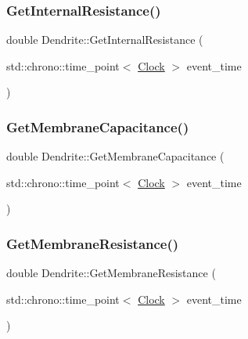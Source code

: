 \mbox{\label{classDendrite_a7dd00ac5440edf9943389951a275b9bc}} 
\subsubsection{\texorpdfstring{Get\+Internal\+Resistance()}{GetInternalResistance()}}
{\footnotesize\ttfamily double Dendrite\+::\+Get\+Internal\+Resistance (\begin{DoxyParamCaption}\item[{std\+::chrono\+::time\+\_\+point$<$ \mbox{\hyperlink{universe_8h_a0ef8d951d1ca5ab3cfaf7ab4c7a6fd80}{Clock}} $>$}]{event\+\_\+time }\end{DoxyParamCaption})\hspace{0.3cm}{\ttfamily [inline]}}

\mbox{\label{classDendrite_a3551fe5fcf9c7ec767a6171f61a5ba51}} 
\subsubsection{\texorpdfstring{Get\+Membrane\+Capacitance()}{GetMembraneCapacitance()}}
{\footnotesize\ttfamily double Dendrite\+::\+Get\+Membrane\+Capacitance (\begin{DoxyParamCaption}\item[{std\+::chrono\+::time\+\_\+point$<$ \mbox{\hyperlink{universe_8h_a0ef8d951d1ca5ab3cfaf7ab4c7a6fd80}{Clock}} $>$}]{event\+\_\+time }\end{DoxyParamCaption})\hspace{0.3cm}{\ttfamily [inline]}}

\mbox{\label{classDendrite_ab70008318cada82e0f21f8f010858eaa}} 
\subsubsection{\texorpdfstring{Get\+Membrane\+Resistance()}{GetMembraneResistance()}}
{\footnotesize\ttfamily double Dendrite\+::\+Get\+Membrane\+Resistance (\begin{DoxyParamCaption}\item[{std\+::chrono\+::time\+\_\+point$<$ \mbox{\hyperlink{universe_8h_a0ef8d951d1ca5ab3cfaf7ab4c7a6fd80}{Clock}} $>$}]{event\+\_\+time }\end{DoxyParamCaption})\hspace{0.3cm}{\ttfamily [inline]}}

